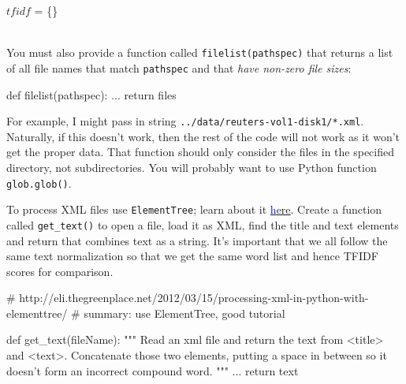 \begin{fullwidth}
\begin{function}
\vspace{-4pt}
\Indp
	$tfidf$ = \{\}\\
	 \\
\end{function}

You must also provide a function called {\tt filelist(pathspec)} that returns a list of all file names that match {\tt pathspec} and that {\em  have non-zero file sizes}:

\begin{pyverbatim}
def filelist(pathspec):
    ...
    return files
\end{pyverbatim}
	
For example, I might pass in string {\tt\small ../data/reuters-vol1-disk1/*.xml}. Naturally, if this doesn't work, then the rest of the code will not work as it won't get the proper data.  That function should only consider the files in the specified directory, not subdirectories.  You will probably want to use Python function {\tt glob.glob()}.

To process XML files use {\tt ElementTree}; learn about it \href{http://eli.thegreenplace.net/2012/03/15/processing-xml-in-python-with-elementtree/}{\textcolor{blue}here}.  Create a function called {\tt get\_text()} to open a file, load it as XML, find the title and text elements and return that combines text as a string. It's important that we all follow the same text normalization so that we get the same word list and hence TFIDF scores for comparison.

\begin{pyverbatim}
# http://eli.thegreenplace.net/2012/03/15/processing-xml-in-python-with-elementtree/
# summary: use ElementTree, good tutorial

def get_text(fileName):
    """
    Read an xml file and return the text from <title> and <text>.
    Concatenate those two elements, putting a space in between so it doesn't
    form an incorrect compound word.    
    """
    ...
    return text
\end{pyverbatim}


\end{fullwidth}

